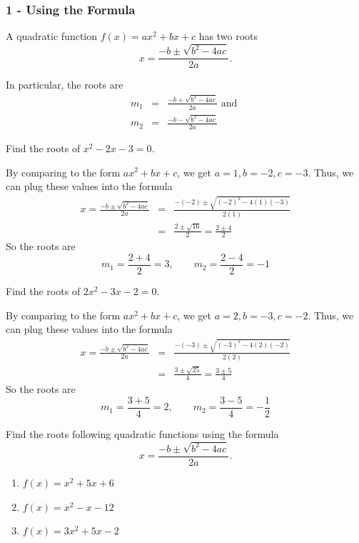 \begin{frame}
\frametitle{1 - Using the Formula}
\begin{thm}{}{}
A quadratic function $f(x) = ax^2 + bx + c$ has two roots
\[ x =  \frac{-b \pm \sqrt{b^2 - 4ac}}{2a}.\]

In particular, the roots are
\begin{eqnarray*}
m_1 &=& \frac{-b + \sqrt{b^2 - 4ac}}{2a} \text{ and } \\
m_2 &=& \frac{-b - \sqrt{b^2 - 4ac}}{2a} 
\end{eqnarray*}
\end{thm}
\end{frame}


\begin{frame}[t]
\begin{ex}
Find the roots of $x^2 - 2x - 3=0$.
\end{ex}
\begin{sol}
By comparing to the form $ax^2 + bx + c$, we get $a = 1, b = -2,  c = -3$. Thus, we can plug these values into the formula
\begin{eqnarray*}
x  = \frac{-b \pm \sqrt{b^2 - 4ac}}{2a} &=& \frac{-(-2) \pm \sqrt{(-2)^2 - 4(1)(-3)}}{2(1)} \\
&=& \frac{2 \pm \sqrt{16}}{2} = \frac{2 \pm 4}{2}
\end{eqnarray*}
So the roots are
\[ m_1 = \frac{2+4}{2} = 3, \qquad m_2 = \frac{2-4}{2} = -1\]
\end{sol}
\end{frame}


\begin{frame}[t]
\begin{ex}
Find the roots of $2x^2 - 3x -2=0$.
\end{ex}
\begin{sol}
By comparing to the form $ax^2 + bx + c$, we get $a = 2, b = -3, c = -2$. Thus, we can plug these values into the formula
\begin{eqnarray*}
x  = \frac{-b \pm \sqrt{b^2 - 4ac}}{2a} &=& \frac{-(-3) \pm \sqrt{(-3)^2 - 4(2)(-2)}}{2(2)} \\
&=& \frac{3 \pm \sqrt{25}}{4} = \frac{3 \pm 5}{4}
\end{eqnarray*}
So the roots are
\[ m_1 = \frac{3+5}{4} = 2, \qquad m_2 = \frac{3-5}{4} = -\frac{1}{2}\]
\end{sol}
\end{frame}

\begin{frame}
\begin{exercisebox}{}{}
Find the roots following quadratic functions using the formula
\[ x =  \frac{-b \pm \sqrt{b^2 - 4ac}}{2a}.\]
\begin{enumerate}
\item $f(x) = x^2 +5x+6$
\item $f(x) = x^2 - x - 12$
\item $f(x) = 3x^2 +5x - 2$
\end{enumerate}
\end{exercisebox}
\end{frame}


